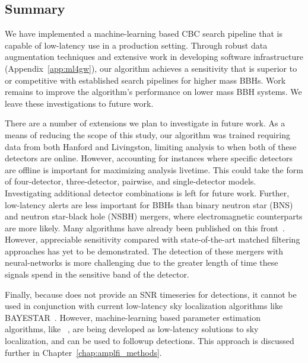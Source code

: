 \begin{refsection}
\section{Summary}
We have implemented a machine-learning based CBC search pipeline that is capable of low-latency use in a production setting. 
Through robust data augmentation techniques and extensive work in developing software infrastructure (Appendix~\ref{app:ml4gw}), our algorithm achieves a sensitivity that is superior to or competitive with established search pipelines for higher mass BBHs. 
Work remains to improve the algorithm's performance on lower mass BBH systems. 
We leave these investigations to future work.

There are a number of extensions we plan to investigate in future work. 
As a means of reducing the scope of this study, our algorithm was trained requiring data from both Hanford and Livingston, limiting analysis to when both of these detectors are online. 
However, accounting for instances where specific detectors are offline is important for maximizing analysis livetime. 
This could take the form of four-detector, three-detector, pairwise, and single-detector models. 
Investigating additional detector combinations is left for future work.
Further, low-latency alerts are less important for BBHs than binary neutron star (BNS) and neutron star-black hole (NSBH) mergers, where electromagnetic counterparts are more likely. 
Many algorithms have already been published on this front~\cite{Lin_2019, PhysRevD.102.063015, KRASTEV2020135330, Aveiro_2022, Qiu_2023}. 
However, appreciable sensitivity compared with state-of-the-art matched filtering approaches has yet to be demonstrated.
The detection of these mergers with neural-networks is more challenging due to the greater length of time these signals spend in the sensitive band of the detector.

Finally, because \aframe does not provide an SNR timeseries for detections, it cannot be used in conjunction with current low-latency sky localization algorithms like BAYESTAR~\cite{Singer_2016}. 
However, machine-learning based parameter estimation algorithms, like \amplfi~\cite{amplfi}, are being developed as low-latency solutions to sky localization, and can be used to followup \aframe detections.
This approach is discussed further in Chapter~\ref{chap:amplfi_methods}.

\singlespacing
\printbibliography[title=References, heading=subbibintoc]

\end{refsection}


